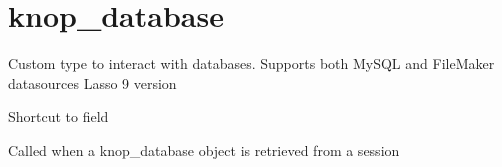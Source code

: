 \documentclass[letterpaper,10pt,english]{sphinxmanual}
\begin{document}
\chapter{knop\_database}
\label{knop_database::doc}\label{knop_database:knop-database}

\begin{fulllineitems}
\label{knop_database:knop_database}
Custom type to interact with databases. Supports both MySQL and FileMaker datasources
Lasso 9 version

\begin{fulllineitems}
\label{knop_database:knop_database._unknowntag}
Shortcut to field

\end{fulllineitems}


\begin{fulllineitems}
\label{knop_database:knop_database.acceptDeserializedElement}
Called when a knop\_database object is retrieved from a session

\end{fulllineitems}


\begin{fulllineitems}
\label{knop_database:knop_database.action_statement}
\end{fulllineitems}



\begin{fulllineitems}
\end{fulllineitems}


\begin{fulllineitems}
\label{knop_database:knop_database.addrecord}
\end{fulllineitems}


\end{fulllineitems}
\end{document}
